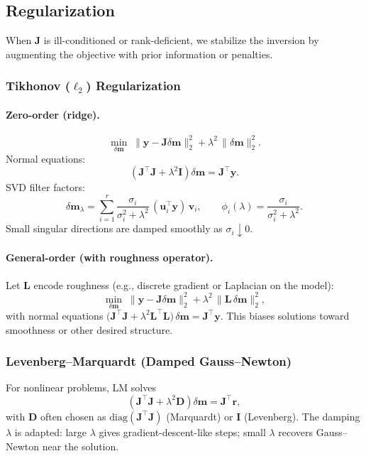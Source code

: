 \documentclass[11pt,a4paper]{article}
\begin{document}
\subsection{Regularization}\label{subsec:reg}
When $\mathbf{J}$ is ill-conditioned or rank-deficient, we stabilize the inversion by augmenting the objective with prior information or penalties.

\subsubsection{Tikhonov ($\ell_2$) Regularization}
\paragraph{Zero-order (ridge).}
\[
\min_{\delta\mathbf{m}} \; \|\mathbf{y}-\mathbf{J}\delta\mathbf{m}\|_2^2 + \lambda^2 \,\|\delta\mathbf{m}\|_2^2.
\]
Normal equations:
\[
\left(\mathbf{J}^\top \mathbf{J} + \lambda^2 \mathbf{I}\right)\delta\mathbf{m} = \mathbf{J}^\top \mathbf{y}.
\]
SVD filter factors:
\[
\delta\mathbf{m}_\lambda = \sum_{i=1}^r \frac{\sigma_i}{\sigma_i^2+\lambda^2}\,(\mathbf{u}_i^\top \mathbf{y})\,\mathbf{v}_i,\qquad
\phi_i(\lambda)=\frac{\sigma_i}{\sigma_i^2+\lambda^2}.
\]
Small singular directions are damped smoothly as $\sigma_i \downarrow 0$.

\paragraph{General-order (with roughness operator).}
Let $\mathbf{L}$ encode roughness (e.g., discrete gradient or Laplacian on the model):
\[
\min_{\delta\mathbf{m}} \; \|\mathbf{y}-\mathbf{J}\delta\mathbf{m}\|_2^2 + \lambda^2 \,\|\mathbf{L}\,\delta\mathbf{m}\|_2^2,
\]
with normal equations $\big(\mathbf{J}^\top \mathbf{J} + \lambda^2 \mathbf{L}^\top \mathbf{L}\big)\,\delta\mathbf{m} = \mathbf{J}^\top \mathbf{y}$. This biases solutions toward smoothness or other desired structure.

\subsubsection{Levenberg--Marquardt (Damped Gauss--Newton)}
For nonlinear problems, LM solves
\[
\left(\mathbf{J}^\top\mathbf{J} + \lambda^2 \mathbf{D}\right)\delta\mathbf{m} = \mathbf{J}^\top \mathbf{r},
\]
with $\mathbf{D}$ often chosen as $\mathrm{diag}(\mathbf{J}^\top \mathbf{J})$ (Marquardt) or $\mathbf{I}$ (Levenberg). The damping $\lambda$ is adapted: large $\lambda$ gives gradient-descent-like steps; small $\lambda$ recovers Gauss--Newton near the solution.
\end{document}
